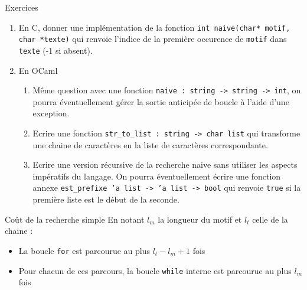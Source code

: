 \documentclass[10pt]{beamer}
\begin{document}
\begin{frame}{\Ctitle}{\stitle}
	\begin{exampleblock}{Exercices}
		\begin{enumerate}
		\item En C, donner une implémentation de la fonction \texttt{int naive(char* motif, char *texte)} qui renvoie l'indice de la première occurence de {\tt motif} dans {\tt texte}  (-1 si absent).
		\item En OCaml
			\begin{enumerate}
			\item Même question avec une fonction {\tt naive : string -> string -> int}, on pourra éventuellement gérer la sortie anticipée de boucle à l'aide d'une exception.
			\item Ecrire une fonction {\tt str\_to\_list : string -> char list} qui transforme une chaine de caractères en la liste de caractères correspondante.
			\item Ecrire une version récursive de la recherche naive sans utiliser les aspects impératifs du langage. On pourra éventuellement écrire une fonction annexe {\tt est\_prefixe 'a list -> 'a list -> bool} qui renvoie {\tt true} si la première liste est le début de la seconde.
			\end{enumerate}
		\end{enumerate}
	\end{exampleblock}
\end{frame}

\begin{frame}{\Ctitle}{\stitle}
	\begin{block}{Coût de la recherche simple}
		En notant $l_m$ la longueur du motif et $l_t$ celle de la chaine :
		\begin{itemize}
			\item<2-> La boucle \texttt{for} est parcourue au plus $l_t-l_m+1$ fois
			\item<3-> Pour chacun de ces parcours, la boucle \texttt{while} interne est parcourue au plus $l_m$ fois
		\end{itemize}
	\end{block}
\end{frame}
\end{document}
